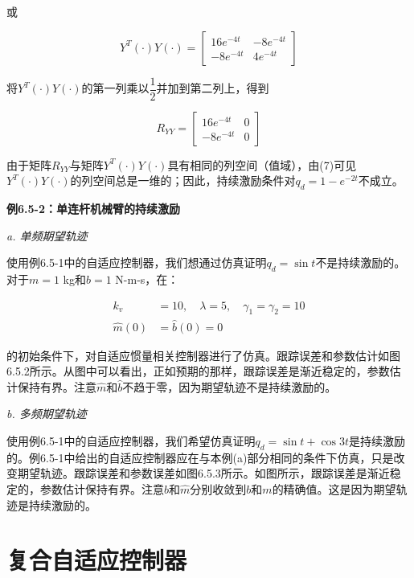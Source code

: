 \documentclass[12pt,a4paper]{ctexart}
\begin{document}
或

\begin{equation}\tag{6}
Y^T(\cdot)Y(\cdot) = \begin{bmatrix} 16e^{-4t} & -8e^{-4t} \\ -8e^{-4t} & 4e^{-4t} \end{bmatrix}
\end{equation}

将$Y^T(\cdot)Y(\cdot)$的第一列乘以$\dfrac{1}{2}$并加到第二列上，得到

\begin{equation}\tag{7}
R_{YY} = \begin{bmatrix} 16e^{-4t} & 0 \\ -8e^{-4t} & 0 \end{bmatrix}
\end{equation}

由于矩阵$R_{YY}$与矩阵$Y^T(\cdot)Y(\cdot)$具有相同的列空间（值域），由(7)可见$Y^T(\cdot)Y(\cdot)$的列空间总是一维的；因此，持续激励条件对$q_d = 1 - e^{-2t}$不成立。

\textbf{例6.5-2：单连杆机械臂的持续激励}

\textit{a. 单频期望轨迹}

使用例6.5-1中的自适应控制器，我们想通过仿真证明$q_d = \sin t$不是持续激励的。对于$m = 1$ kg和$b = 1$ N-m-s，在：

\begin{align}
k_v &= 10, \quad \lambda = 5, \quad \gamma_1 = \gamma_2 = 10 \\
\hat{m}(0) &= \hat{b}(0) = 0
\end{align}

的初始条件下，对自适应惯量相关控制器进行了仿真。跟踪误差和参数估计如图6.5.2所示。从图中可以看出，正如预期的那样，跟踪误差是渐近稳定的，参数估计保持有界。注意$\hat{m}$和$\hat{b}$不趋于零，因为期望轨迹不是持续激励的。

\textit{b. 多频期望轨迹}

使用例6.5-1中的自适应控制器，我们希望仿真证明$q_d = \sin t + \cos 3t$是持续激励的。例6.5-1中给出的自适应控制器应在与本例(a)部分相同的条件下仿真，只是改变期望轨迹。跟踪误差和参数误差如图6.5.3所示。如图所示，跟踪误差是渐近稳定的，参数估计保持有界。注意$\hat{b}$和$\hat{m}$分别收敛到$b$和$m$的精确值。这是因为期望轨迹是持续激励的。

\section{复合自适应控制器}\label{sec:composite}
\end{document}
